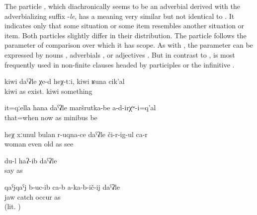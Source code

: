 The particle  , which diachronically seems to be an adverbial derived with the adverbializing suffix -\textit{le}, has a meaning very similar but not identical to . It indicates only that some situation or some item resembles another situation or item. Both particles slightly differ in their distribution. The particle  follows the parameter of comparison over which it has scope. As with , the parameter can be expressed by nouns , adverbials , or adjectives . But in contrast to ,  is most frequently used in non-finite clauses headed by participles  or the infinitive . 
%
\begin{exe}
	\ex	\label{ex:‎This looks like kiwi, similar to kiwi or so}
	\gll	kiwi	daˁʡle	χe-d	heχ-tːi,	kiwi	ʁuna	cik'al\\
		kiwi	as	exist.		kiwi 	something\\
	\glt	{}

	\ex	\label{ex:At that (time) there were no minibuses like now}
	\gll	it=qːella	hana	daˁʡle	maršrutka-be	a-d-irχʷ-i=q'al\\
		that=when	now	as	minibus	be\\
	\glt	{}

	\ex	\label{ex:This woman looks even like old.}
	\gll	heχ	xːunul	bulan	r-uqna-ce	daˁʡle	či-r-ig-ul	ca-r\\
			woman	even	old	as	see	\\
	\glt	{} 

	\ex	\label{ex:as I said}
	\gll	du-l	haʔ-ib daˁʡle\\
			say	as\\
	\glt	{}
	
		\ex	\label{ex:He is keeping his jar as if it fell down}
	\gll	qaˁjqaˁj	b-uc-ib ca-b	a-ka-b-ič-ij	daˁʡle\\
		jaw	catch 	occur	as\\
	\glt	{} (lit. )
\end{exe}

